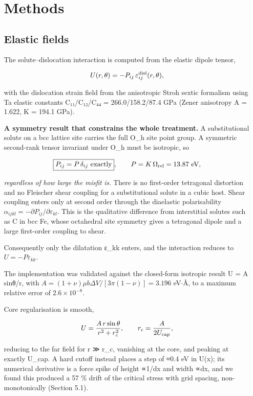\hypertarget{methods}{%
\section{Methods}\label{sec:methods}}

\hypertarget{elastic-fields}{%
\subsection{Elastic fields}\label{sec:elastic-fields}}

The solute--dislocation interaction is computed from the elastic dipole tensor,

\[U(r,\theta) = -P_{ij}\,\varepsilon_{ij}^{\rm disl}(r,\theta),\]

with the dislocation strain field from the anisotropic Stroh sextic formalism using Ta elastic constants C₁₁/C₁₂/C₄₄ = 266.0/158.2/87.4 GPa (Zener anisotropy A = 1.622, K = 194.1 GPa).

\textbf{A symmetry result that constrains the whole treatment.} A substitutional solute on a bcc lattice site carries the full O\_h site point group. A symmetric second-rank tensor invariant under O\_h must be isotropic, so

\[\boxed{P_{ij} = P\,\delta_{ij}\ \text{exactly}},\qquad P = K\,\Omega_{\rm rel} = 13.87\ \text{eV},\]

\emph{regardless of how large the misfit is.} There is no first-order tetragonal distortion and no Fleischer shear coupling for a substitutional solute in a cubic host. Shear coupling enters only at second order through the diaelastic polarisability \(\alpha_{ijkl} = -\partial P_{ij}/\partial\varepsilon_{kl}\). This is the qualitative difference from interstitial solutes such as C in bcc Fe, whose octahedral site symmetry gives a tetragonal dipole and a large first-order coupling to shear.

Consequently only the dilatation ε\_kk enters, and the interaction reduces to \(U = -P\varepsilon_{kk}\).

The implementation was validated against the closed-form isotropic result U = A sinθ/r, with \(A = (1+\nu)\mu b\Delta V/[3\pi(1-\nu)] = 3.196\) eV\(\cdot\)\AA, to a maximum relative error of \textbf{\(2.6\times10^{-8}\)}.

Core regularisation is smooth,

\[U = \frac{A\,r\sin\theta}{r^2 + r_c^2},\qquad r_c = \frac{A}{2U_{\rm cap}},\]

reducing to the far field for r ≫ r\_c, vanishing at the core, and peaking at exactly U\_cap. A hard cutoff instead places a step of ≈0.4 eV in U(x); its numerical derivative is a force spike of height ∝1/dx and width ∝dx, and we found this produced a 57 \% drift of the critical stress with grid spacing, non-monotonically (Section 5.1).


